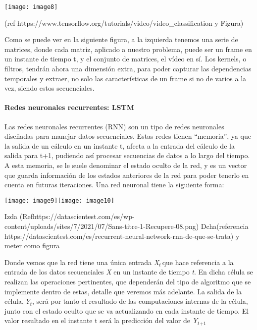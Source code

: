 \documentclass{article} %
\begin{document}
\noindent 

\noindent \texttt{[image: image8]}

\noindent 

\noindent (ref https://www.tensorflow.org/tutorials/video/video\_classification y Figura)

\noindent 

\noindent Como se puede ver en la siguiente figura, a la izquierda tenemos una serie de matrices, donde cada matriz, aplicado a nuestro problema, puede ser un frame en un instante de tiempo t, y el conjunto de matrices, el v\'{i}deo en s\'{i}. Los kernels, o filtros, tendr\'{a}n ahora una dimensi\'{o}n extra, para poder capturar las dependencias temporales y extraer, no solo las caracter\'{i}sticas de un frame si no de varios a la vez, siendo estos secuenciales.

\noindent 


\paragraph{ Redes neuronales recurrentes: LSTM}

\noindent Las redes neuronales recurrentes (RNN) son un tipo de redes neuronales dise\~{n}adas para manejar datos secuenciales. Estas redes tienen ``memoria'', ya que la salida de un c\'{a}lculo en un instante t, afecta a la entrada del c\'{a}lculo de la salida para t+1, pudiendo as\'{i} procesar secuencias de datos a lo largo del tiempo. A esta memoria, se le suele denominar el estado oculto de la red, y es un vector que guarda informaci\'{o}n de los estados anteriores de la red para poder tenerlo en cuenta en futuras iteraciones. Una red neuronal tiene la siguiente forma:

\noindent 

\noindent \texttt{[image: image9]}\texttt{[image: image10]}

\noindent Izda (Refhttps://datascientest.com/es/wp-content/uploads/sites/7/2021/07/Sans-titre-1-Recupere-08.png) Dcha(referencia https://datascientest.com/es/recurrent-neural-network-rnn-de-que-se-trata) y meter como figura

\noindent 

\noindent Donde vemos que la red tiene una \'{u}nica entrada \textit{X${}_{t\ }$}que hace referencia a la entrada de los datos secuenciales \textit{X} en un instante de tiempo \textit{t}. En dicha c\'{e}lula se realizan las operaciones pertinentes, que depender\'{a}n del tipo de algoritmo que se implemente dentro de estas, detalle que veremos m\'{a}s adelante. La salida de la c\'{e}lula, $Y$\textit{${}_{t}$}, ser\'{a} por tanto el resultado de las computaciones internas de la c\'{e}lula, junto con el estado oculto que se va actualizando en cada instante de tiempo. El valor resultado en el instante t ser\'{a} la predicci\'{o}n del valor de \textit{Y${}_{t}$${}_{+1}$}
\end{document}
